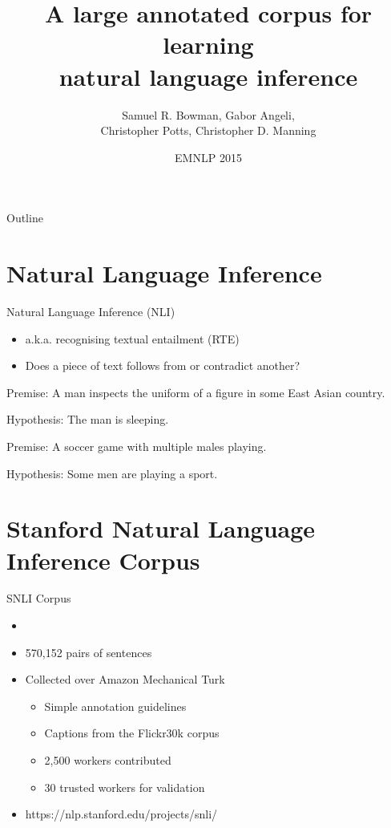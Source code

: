 \documentclass{beamer}
\title{A large annotated corpus for learning\\natural language inference}
\subtitle{}
\author{Samuel R. Bowman, Gabor Angeli,\\Christopher Potts, Christopher D. Manning}
\institute[Stanford University] %
{
  Stanford NLP Group\\
  Stanford University
}
\date{EMNLP 2015}
\begin{document}
\begin{frame}
  \titlepage
\end{frame}

\begin{frame}{Outline}
  \tableofcontents
\end{frame}

\section{Natural Language Inference}

\begin{frame}{Natural Language Inference (NLI)}
    \begin{itemize}
        \item a.k.a. recognising textual entailment (RTE)
        \item Does a piece of text follows from or contradict another?
    \end{itemize}
    \begin{example}
        Premise: A man inspects the uniform of a figure in some East Asian country.
        
        Hypothesis: The man is sleeping.
        
    \end{example}
    \begin{example}
        Premise: A soccer game with multiple males playing.
        
        Hypothesis: Some men are playing a sport.
        
    \end{example}
\end{frame}


\section{Stanford Natural Language Inference Corpus}

\begin{frame}{SNLI Corpus}
    \begin{itemize}
        \item \cite{snli:emnlp2015}
        \item 570,152 pairs of sentences
        \item Collected over Amazon Mechanical Turk
            \begin{itemize}
                \item Simple annotation guidelines
                \item Captions  from  the Flickr30k corpus
                \item 2,500 workers contributed
                \item 30 trusted workers for validation
            \end{itemize}
        \item https://nlp.stanford.edu/projects/snli/
    \end{itemize}
\end{frame}
\end{document}
